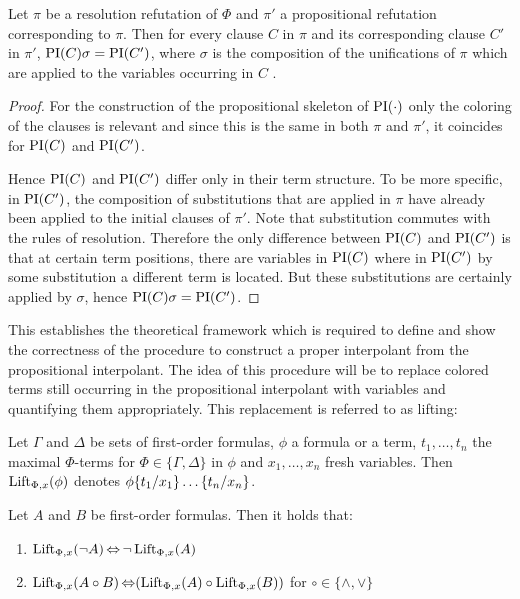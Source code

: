 \begin{lemma}
	Let $\pi$ be a resolution refutation of $\Phi$ and $\pi'$ a propositional refutation corresponding to $\pi$.
	Then for every clause $C$ in $\pi$ and its corresponding clause $C'$ in $\pi'$, $\PI(C)\sigma = \PI(C')$, where $\sigma$ is the composition of the unifications of $\pi$ which are applied to the variables occurring in $C$ .
\end{lemma}
\begin{proof}
	For the construction of the propositional skeleton of $\PI(\cdot)$ only the coloring of the clauses is relevant and since this is the same in both $\pi$ and $\pi'$, it coincides for $\PI(C)$ and $\PI(C')$.

	Hence $\PI(C)$ and $\PI(C')$ differ only in their term structure. 
	To be more specific, in $\PI(C')$, the composition of substitutions that are applied in $\pi$ have already been applied to the initial clauses of $\pi'$. 
	Note that substitution commutes with the rules of resolution.
	Therefore the only difference between $\PI(C)$ and $\PI(C')$ is that at certain term positions, there are variables in $\PI(C)$ where in $\PI(C')$ by some substitution a different term is located. 
	But these substitutions are certainly applied by $\sigma$, hence $\PI(C)\sigma = \PI(C')$.
\end{proof}

This establishes the theoretical framework which is required to define and show the correctness of the procedure to construct a proper interpolant from the propositional interpolant.
The idea of this procedure will be to replace colored terms still occurring in the propositional interpolant with variables and quantifying them appropriately.
This replacement is referred to as lifting:


\begin{defi}
	Let $\Gamma$ and $\Delta$ be sets of first-order formulas, 
	$\phi$ a formula or a term, $t_1, \ldots, t_n$ the maximal $\Phi$-terms for $\Phi \in \{\Gamma, \Delta\}$ in $\phi$ and $x_1, \ldots, x_n$ fresh variables.
	Then $\lift{\Phi}{\phi}{x}$ denotes $\phi\termsubst{t_1/x_1}\ldots\termsubst{t_n/x_n}$.
\end{defi}

\begin{lemma} 
	\label{lemma:lift_commute}
	Let $A$ and $B$ be first-order formulas. Then it holds that:
	\begin{enumerate}
		\item $\lift{\Phi}{\lnot A}{x} \liff \lnot \lift{\Phi}{A}{x}$
		\item $\lift{\Phi}{A \circ B}{x} \liff ( \lift{\Phi}{A}{x} \circ \lift{\Phi}{B}{x} )$ for $\circ \in \{\land, \lor\}$
	\end{enumerate}
\end{lemma}

